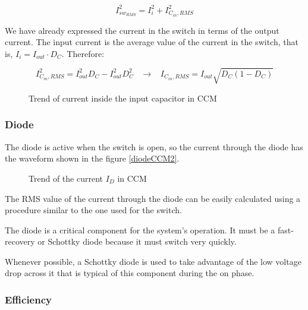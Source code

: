 \documentclass[../main.tex]{subfiles}
\begin{document}
\begin{equation}
	I^2_{sw_{RMS}} = I^2_i + I^2_{C_{in},RMS}
\end{equation}

We have already expressed the current in the switch in terms of the output current. The input current is the average value of the current in the switch, that is, $I_i = I_{out} \cdot D_C$. 
Therefore:

\begin{equation}
	I^2_{C_{in},RMS} = I^2_{out} D_C -  I^2_{out} D^2_C \hspace{10pt} \longrightarrow \hspace{10pt} I_{C_{in}, RMS} = I_{out} \sqrt{D_C(1-D_C)}
\end{equation}

\begin{figure}[h!]
\begin{center}


\label{diodeCCM}
\caption{Trend of current inside the input capacitor in CCM}	
\end{center}
\end{figure}

\subsubsection*{Diode}

The diode is active when the switch is open, so the current through the diode has the waveform shown in the figure \autoref{diodeCCM2}.


\begin{figure}[h!]
\begin{center}


\label{diodeCCM2}
\caption{Trend of the current $I_D$ in CCM}	
\end{center}
\end{figure}

The RMS value of the current through the diode can be easily calculated using a procedure similar to the one used for the switch. 

The diode is a critical component for the system’s operation. It must be a fast-recovery or Schottky diode because it must switch very quickly. 

Whenever possible, a Schottky diode is used to take advantage of the low voltage drop across it that is typical of this component during the on phase.


\subsubsection*{Efficiency}
\end{document}
